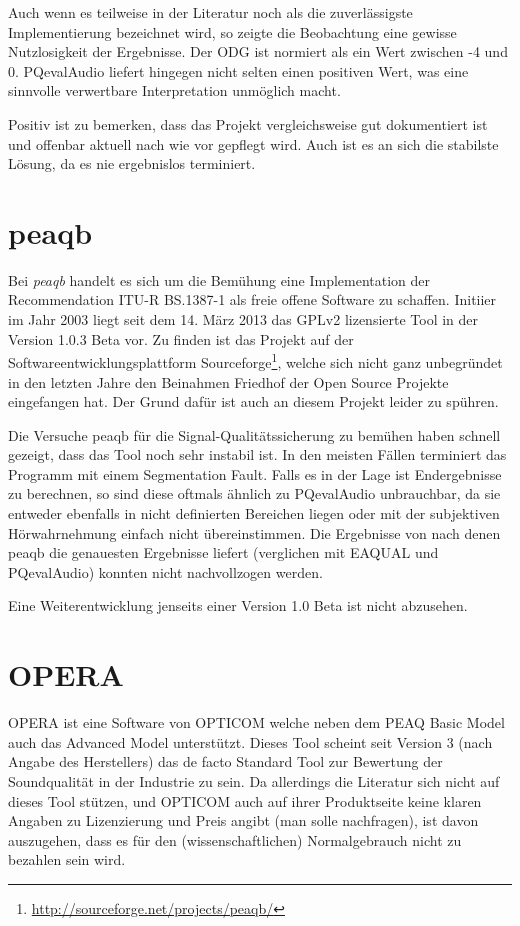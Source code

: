 Auch wenn es teilweise in der Literatur noch als die zuverlässigste Implementierung bezeichnet wird\cite{nishimura2013objective}, so zeigte die Beobachtung eine gewisse Nutzlosigkeit der Ergebnisse. Der ODG ist normiert als ein Wert zwischen -4 und 0. PQevalAudio liefert hingegen nicht selten einen positiven Wert, was eine sinnvolle verwertbare Interpretation unmöglich macht.

Positiv ist zu bemerken, dass das Projekt vergleichsweise gut dokumentiert ist und offenbar aktuell nach wie vor gepflegt wird. Auch ist es an sich die stabilste Lösung, da es nie ergebnislos terminiert.

\section{peaqb}

Bei \textit{peaqb} handelt es sich um die Bemühung eine Implementation der Recommendation ITU-R BS.1387-1 als freie offene Software zu schaffen. Initiier im Jahr 2003 liegt seit dem 14. März 2013 das GPLv2 lizensierte Tool in der Version 1.0.3 Beta vor. Zu finden ist das Projekt auf der Softwareentwicklungsplattform Sourceforge\footnote{\url{http://sourceforge.net/projects/peaqb/}}, welche sich nicht ganz unbegr\"undet in den letzten Jahre den Beinahmen \glqq Friedhof der Open Source Projekte\grqq{} eingefangen hat. Der Grund daf\"ur ist auch an diesem Projekt leider zu sp\"uhren. 

Die Versuche peaqb für die Signal-Qualitätssicherung zu bem\"uhen haben schnell gezeigt, dass das Tool noch sehr instabil ist. In den meisten Fällen terminiert das Programm mit einem Segmentation Fault. Falls es in der Lage ist Endergebnisse zu berechnen, so sind diese oftmals ähnlich zu PQevalAudio unbrauchbar, da sie entweder ebenfalls in nicht definierten Bereichen liegen oder mit der subjektiven H\"orwahrnehmung einfach nicht \"ubereinstimmen. Die Ergebnisse von \cite{kondo2012use} nach denen peaqb die genauesten Ergebnisse liefert (verglichen mit EAQUAL und PQevalAudio) konnten nicht nachvollzogen werden.

Eine Weiterentwicklung jenseits einer Version 1.0 Beta ist nicht abzusehen. 

\section{OPERA}

OPERA ist eine Software von OPTICOM welche neben dem PEAQ Basic Model auch das Advanced Model unterstützt. Dieses Tool scheint seit Version 3 (nach Angabe des Herstellers) das de facto Standard Tool zur Bewertung der Soundqualität in der Industrie zu sein. Da allerdings die Literatur sich nicht auf dieses Tool stützen, und OPTICOM auch auf ihrer Produktseite keine klaren Angaben zu Lizenzierung und Preis angibt (man solle nachfragen), ist davon auszugehen, dass es für den (wissenschaftlichen) \glqq{}Normalgebrauch\grqq{} nicht zu bezahlen sein wird.



